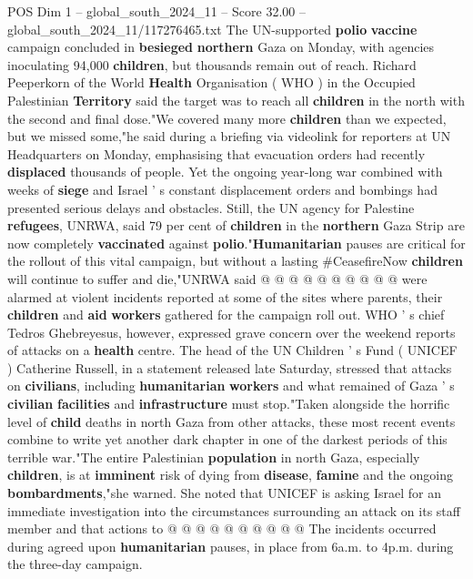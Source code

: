 \begin{textsample}{POS Dim 1 – global\_south\_2024\_11 – Score 32.00 – global\_south\_2024\_11/117276465.txt}  \label{ex:f1_pos_243}
The UN-supported \textbf{polio} \textbf{vaccine} campaign concluded in \textbf{besieged} \textbf{northern} Gaza on Monday, with agencies inoculating 94,000 \textbf{children}, but thousands remain out of reach.
Richard Peeperkorn of the World \textbf{Health} Organisation ( WHO ) in the Occupied Palestinian \textbf{Territory} said the target was to reach all \textbf{children} in the north with the second and final dose."We covered many more \textbf{children} than we expected, but we missed some,"he said during a briefing via videolink for reporters at UN Headquarters on Monday, emphasising that evacuation orders had recently \textbf{displaced} thousands of people.
Yet the ongoing year-long war combined with weeks of \textbf{siege} and Israel ' s constant displacement orders and bombings had presented serious delays and obstacles.
Still, the UN agency for Palestine \textbf{refugees}, UNRWA, said 79 per cent of \textbf{children} in the \textbf{northern} Gaza Strip are now completely \textbf{vaccinated} against \textbf{polio}."\textbf{Humanitarian} pauses are critical for the rollout of this vital campaign, but without a lasting \#CeasefireNow \textbf{children} will continue to suffer and die,"UNRWA said @ @ @ @ @ @ @ @ @ @ were alarmed at violent incidents reported at some of the sites where parents, their \textbf{children} and \textbf{aid} \textbf{workers} gathered for the campaign roll out.
WHO ' s chief Tedros Ghebreyesus, however, expressed grave concern over the weekend reports of attacks on a \textbf{health} centre.
The head of the UN Children ' s Fund ( UNICEF ) Catherine Russell, in a statement released late Saturday, stressed that attacks on \textbf{civilians}, including \textbf{humanitarian} \textbf{workers} and what remained of Gaza ' s \textbf{civilian} \textbf{facilities} and \textbf{infrastructure} must stop."Taken alongside the horrific level of \textbf{child} deaths in north Gaza from other attacks, these most recent events combine to write yet another dark chapter in one of the darkest periods of this terrible war."The entire Palestinian \textbf{population} in north Gaza, especially \textbf{children}, is at \textbf{imminent} risk of dying from \textbf{disease}, \textbf{famine} and the ongoing \textbf{bombardments},"she warned.
She noted that UNICEF is asking Israel for an immediate investigation into the circumstances surrounding an attack on its staff member and that actions to @ @ @ @ @ @ @ @ @ @ The incidents occurred during agreed upon \textbf{humanitarian} pauses, in place from 6a.m. to 4p.m. during the three-day campaign.

\end{textsample}
